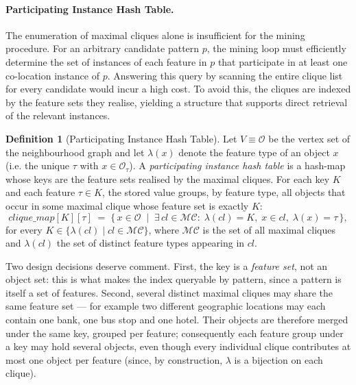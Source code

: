 \documentclass[12pt, letterpaper]{template}
\theoremstyle{definition}
\newtheorem{definition}{Definition}
\begin{document}
\paragraph{Participating Instance Hash Table.}
The enumeration of maximal cliques alone is insufficient for the mining
procedure. For an arbitrary candidate pattern $p$, the mining loop must
efficiently determine the set of instances of each feature in $p$ that
participate in at least one co-location instance of $p$. Answering this
query by scanning the entire clique list for every candidate would incur a
high cost. To avoid this, the cliques are indexed by the feature
sets they realise, yielding a structure that supports direct retrieval of
the relevant instances.

\begin{definition}[Participating Instance Hash Table]
\label{def:pih}
Let $V \equiv \mathcal{O}$ be the vertex set of the neighbourhood graph and
let $\lambda(x)$ denote the feature type of an object $x$ (i.e. the unique
$\tau$ with $x \in \mathcal{O}_\tau$). A \emph{participating instance hash
table} is a hash-map whose keys are the feature sets realised by the
maximal cliques. For each key $K$ and each feature $\tau \in K$, the stored
value groups, by feature type, all objects that occur in some maximal
clique whose feature set is exactly $K$:
\begin{equation}
clique\_map[K][\tau] \;=\;
\{\, x \in \mathcal{O} \;\mid\; \exists\, cl \in \mathcal{MC}:\;
\lambda(cl) = K,\; x \in cl,\; \lambda(x) = \tau \,\},
\end{equation}
for every $K \in \{\lambda(cl) \mid cl \in \mathcal{MC}\}$, where
$\mathcal{MC}$ is the set of all maximal cliques and $\lambda(cl)$ the set
of distinct feature types appearing in $cl$.
\end{definition}

Two design decisions deserve comment. First, the key is a \emph{feature
set}, not an object set: this is what makes the index queryable by
pattern, since a pattern is itself a set of features. Second, several
distinct maximal cliques may share the same feature set --- for example
two different geographic locations may each contain one bank, one bus stop
and one hotel. Their objects are therefore merged under the same key,
grouped per feature; consequently each feature group under a key may hold
several objects, even though every individual clique contributes at most
one object per feature (since, by construction, $\lambda$ is a bijection on
each clique).
\end{document}
